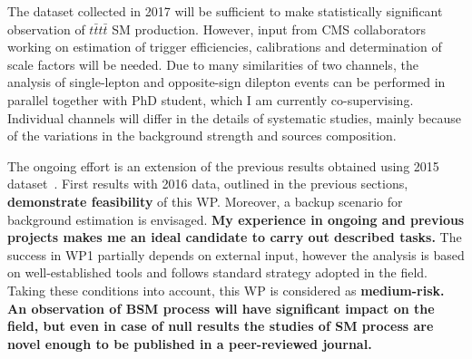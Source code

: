 \textcolor{\mycolor}{
The dataset collected in 2017 will be sufficient to make statistically significant observation of $t\bar{t}t\bar{t}$ SM production. However, input from CMS collaborators working on estimation of trigger efficiencies, calibrations and determination of scale factors will be needed. Due to many similarities of two channels, the analysis of single-lepton and opposite-sign dilepton events can be performed in parallel together with PhD student, which I am currently co-supervising. Individual channels will differ in the details of systematic studies, mainly because of the variations in the background strength and sources composition. 
}

\textcolor{\mycolor}{
The ongoing effort is an extension of the previous results obtained using 2015 dataset~\cite{Sirunyan:2017tep}. First results with 2016 data, outlined in the previous sections, \textbf{demonstrate feasibility} of this WP. Moreover, a backup scenario for background estimation is envisaged. \textbf{My experience in ongoing and previous projects makes me an ideal candidate to carry out described tasks.}
The success in WP1 partially depends on external input, however the analysis is based on well-established tools and follows standard strategy adopted in the field. Taking these conditions into account, this WP is considered as \textbf{medium-risk.} \textbf{An observation of BSM process will have significant impact on the field, but even in case of null results the studies of SM \tttt process are novel enough to be published in a peer-reviewed journal.}
}
